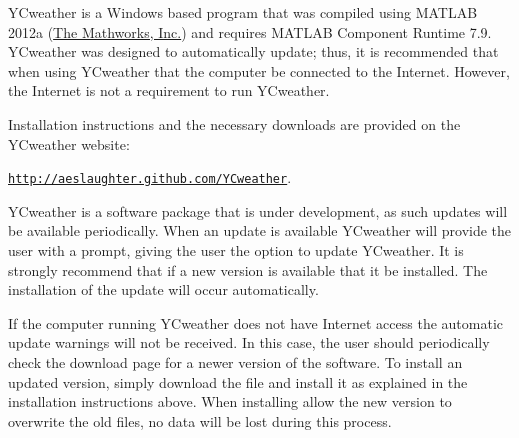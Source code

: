 \label{sec:install}
YCweather is a Windows based program that was compiled using MATLAB 2012a (\href{http://www.mathworks.com}{The Mathworks, Inc.}) and requires MATLAB Component Runtime 7.9.  YCweather was designed to automatically update; thus, it is recommended that when using YCweather that the computer be connected to the Internet.  However, the Internet is not a requirement to run YCweather.

\label{sec:install}
Installation instructions and the necessary downloads are provided on the YCweather website: 
\begin{center}\href{http://aeslaughter.github.com/YCweather}{\nolinkurl{http://aeslaughter.github.com/YCweather}}.\end{center}

YCweather is a software package that is under development, as such updates will be available periodically.  When an update is available YCweather will provide the user with a prompt, giving the user the option to update YCweather.  It is strongly recommend that if a new version is available that it be installed.  The installation of the update will occur automatically. 

If the computer running YCweather does not have Internet access the automatic update warnings will not be received.  In this case, the user should periodically check the download page for a newer version of the software. To install an updated version, simply download the file and install it as explained in the installation instructions above.  When installing allow the new version to overwrite the old files, no data will be lost during this process.  
